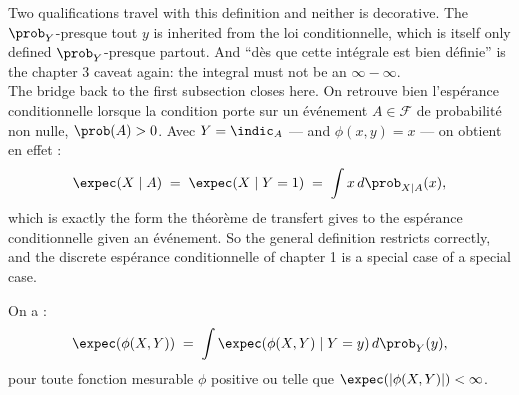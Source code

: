 Two qualifications travel with this definition and neither is decorative. The
$\prob_{Y}$-presque tout $y$ is inherited from the loi conditionnelle, which is
itself only defined $\prob_{Y}$-presque partout. And ``dès que cette intégrale
est bien définie'' is the chapter 3 caveat again: the integral must not be an
$\infty - \infty$.\\

The bridge back to the first subsection closes here. On retrouve bien l'espérance
conditionnelle lorsque la condition porte sur un événement $A \in \mathcal{F}$ de
probabilité non nulle, $\prob(A) > 0$. Avec $Y = \indic_{A}$ --- and
$\phi(x,y) = x$ --- on obtient en effet :
\[
  \expec(X \mid A) \;=\; \expec(X \mid Y = 1) \;=\; \int x \, d\prob_{X \mid A}(x) ,
\]
which is exactly the form the théorème de transfert gives to the espérance
conditionnelle given an événement. So the general definition restricts correctly,
and the discrete espérance conditionnelle of chapter 1 is a special case of a
special case.

\begin{theorem}
  On a :
  \[
    \expec(\phi(X,Y)) \;=\; \int \expec(\phi(X,Y) \mid Y = y) \, d\prob_{Y}(y) ,
  \]
  pour toute fonction mesurable $\phi$ positive ou telle que
  $\expec(|\phi(X,Y)|) < \infty$.
\end{theorem}

